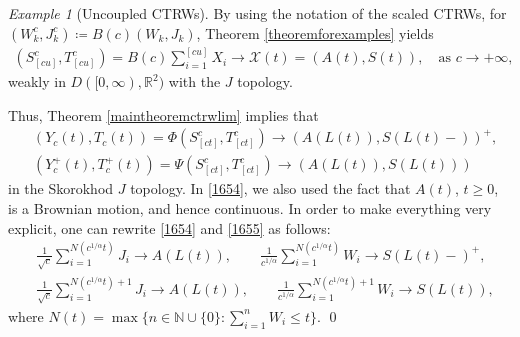 \documentclass[reqno]{amsart}
\theoremstyle{remark}
\newtheorem{example}[theorem]{Example}
\numberwithin{equation}{section} %
\newcommand{\NN}{\mathbb{N}}
\newcommand{\1}{\mathds{1}}
\begin{document}
\begin{example}[Uncoupled CTRWs]
		By using the notation of the scaled CTRWs, for $(W^c_k,J_k^c)\coloneqq B(c)(W_k,J_k)$, Theorem \ref{theoremforexamples} yields
		\begin{align}
			(S^c_{[cu]},T^c_{[cu]})=B(c)\sum_{i=1}^{[cu]}X_i\to \mathcal{X}(t)=(A(t),S(t)),\quad\text{as $c\to+\infty$,}
		\end{align}
		weakly in $D([0,\infty),{\mathbb{R}^{2}})$ with the $J$ topology.
		
		
		Thus, Theorem \ref{maintheoremctrwlim} implies that
		\begin{align}
			&  (Y_c(t),T_c(t))=\Phi ( S^c_{[ct]}, T^c_{[ct]} ) \to (A(L(t)), S(L(t)-))^+ \label{1654},\\
			& (Y^+_c(t),T^+_c(t))=\Psi ( S^c_{[ct]}, T^c_{[ct]} ) \to (A(L(t)), S(L(t)))  \label{1655}
		\end{align}
		in the Skorokhod $J$ topology. In \eqref{1654}, we also used the fact that $A(t)$, $t\ge0$, is a Brownian motion, and hence continuous. In order to make everything very explicit, one can rewrite \eqref{1654} and \eqref{1655} as follows:
		\begin{align}
			& \frac{1}{\sqrt{c}} \sum_{i=1}^{N(c^{1/\alpha} t) } J_i \to A(L(t)), \qquad \frac{1}{c^{1/\alpha}} \sum_{i=1}^{N(c^{1/\alpha}t)} W_i \to S(L(t)-)^+, \\
			&  \frac{1}{\sqrt{c}} \sum_{i=1}^{N(c^{1/\alpha} t)+1 } J_i \to A(L(t)), \qquad \frac{1}{c^{1/\alpha}} \sum_{i=1}^{N(c^{1/\alpha}t)+1} W_i  \to S(L(t)),
		\end{align}
		where $N(t)=\max\{n\in \NN\cup\{0\}: \sum_{i=1}^nW_i\le t\}$.
		\qed
	\end{example}
	
\end{document}
